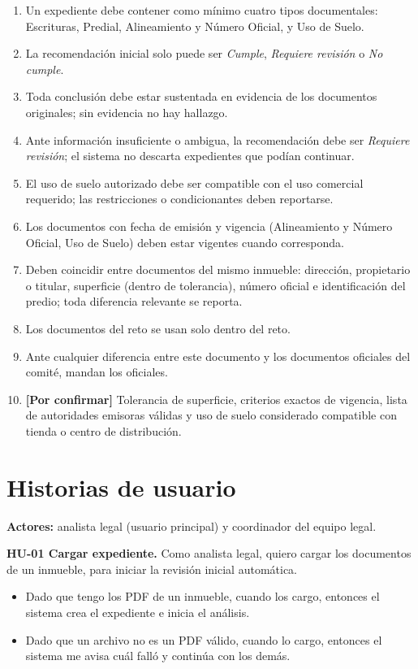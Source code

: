 \documentclass[11pt, a4paper]{article}
\begin{document}
\begin{enumerate}
    \item Un expediente debe contener como mínimo cuatro tipos documentales: Escrituras, Predial, Alineamiento y Número Oficial, y Uso de Suelo.
    \item La recomendación inicial solo puede ser \textit{Cumple}, \textit{Requiere revisión} o \textit{No cumple}.
    \item Toda conclusión debe estar sustentada en evidencia de los documentos originales; sin evidencia no hay hallazgo.
    \item Ante información insuficiente o ambigua, la recomendación debe ser \textit{Requiere revisión}; el sistema no descarta expedientes que podían continuar.
    \item El uso de suelo autorizado debe ser compatible con el uso comercial requerido; las restricciones o condicionantes deben reportarse.
    \item Los documentos con fecha de emisión y vigencia (Alineamiento y Número Oficial, Uso de Suelo) deben estar vigentes cuando corresponda.
    \item Deben coincidir entre documentos del mismo inmueble: dirección, propietario o titular, superficie (dentro de tolerancia), número oficial e identificación del predio; toda diferencia relevante se reporta.
    \item Los documentos del reto se usan solo dentro del reto.
    \item Ante cualquier diferencia entre este documento y los documentos oficiales del comité, mandan los oficiales.
    \item \textbf{[Por confirmar]} Tolerancia de superficie, criterios exactos de vigencia, lista de autoridades emisoras válidas y uso de suelo considerado compatible con tienda o centro de distribución.
\end{enumerate}

\section{Historias de usuario}

\textbf{Actores:} analista legal (usuario principal) y coordinador del equipo legal.

\textbf{HU-01 Cargar expediente.} Como analista legal, quiero cargar los documentos de un inmueble, para iniciar la revisión inicial automática.
\begin{itemize}
    \item Dado que tengo los PDF de un inmueble, cuando los cargo, entonces el sistema crea el expediente e inicia el análisis.
    \item Dado que un archivo no es un PDF válido, cuando lo cargo, entonces el sistema me avisa cuál falló y continúa con los demás.
\end{itemize}
\end{document}
